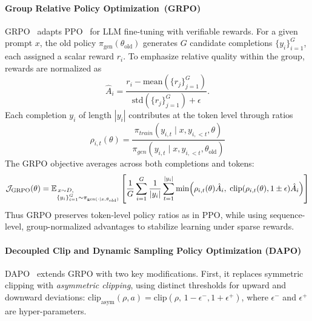 \paragraph{Group Relative Policy Optimization~(GRPO)}
GRPO~\citep{shao2024deepseekmath} adapts PPO~\cite{schulman2017ppo} for LLM fine-tuning with verifiable rewards. 
For a given prompt $x$, the old policy $\pi_{\text{gen}}(\theta_{\text{old}})$ generates $G$ candidate completions $\{y_i\}_{i=1}^G$, each assigned a scalar reward $r_i$. 
To emphasize relative quality within the group, rewards are normalized as
\begin{equation}
    \hat{A}_i = \frac{r_i - \mathrm{mean}(\{r_j\}_{j=1}^G)}{\mathrm{std}(\{r_j\}_{j=1}^G) + \epsilon}. \label{eq:advantage}
\end{equation}
Each completion $y_i$ of length $|y_i|$ contributes at the token level through ratios
\begin{equation}
    \rho_{i,t}(\theta) = \frac{\pi_{train}(y_{i,t} \mid x, y_{i,<t},\theta)}{\pi_{gen}(y_{i,t} \mid x, y_{i,<t}, \theta_{\text{old}})}
\end{equation}
The GRPO objective averages across both completions and tokens:
\begin{equation}
    \mathcal{J}_{\mathrm{GRPO}}(\theta) 
    = \mathbb{E}_{\begin{subarray}{l} \, x \sim D, \\ \{y_i\}_{i=1}^G \sim \pi_{\text{gen}(\cdot \mid x, \theta_{\text{old}})} \end{subarray}}
    \left[ \frac{1}{G} \sum_{i=1}^G \frac{1}{|y_i|} \sum_{t=1}^{|y_i|}
    \min\!\left( \rho_{i,t}(\theta)\hat{A}_i,\; \mathrm{clip}(\rho_{i,t}(\theta), 1\pm \epsilon)\hat{A}_i \right) \right]
\end{equation}
Thus GRPO preserves token-level policy ratios as in PPO, while using sequence-level, group-normalized advantages to stabilize learning under sparse rewards.

\paragraph{Decoupled Clip and Dynamic Sampling Policy Optimization (DAPO)}
DAPO~\citep{yu2025dapo} extends GRPO with two key modifications.  
First, it replaces symmetric clipping with \emph{asymmetric clipping}, using distinct thresholds for upward and downward deviations: $\mathrm{clip}_{\mathrm{asym}}(\rho, a) = \mathrm{clip}(\rho,\, 1-\epsilon^-, 1+\epsilon^+) $, where $\epsilon^-$ and $\epsilon^+$ are hyper-parameters.


